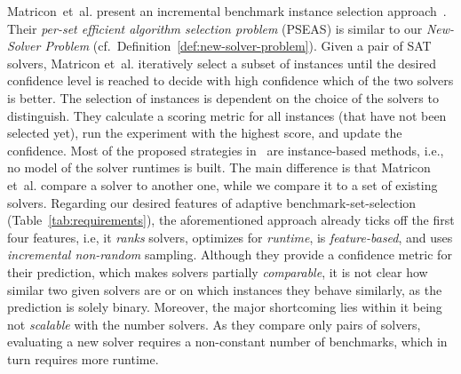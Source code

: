 \documentclass[runningheads]{llncs}
\begin{document}
Matricon~et~al. present an incremental benchmark instance selection approach~\cite{MatriconAFSH21}.
Their \emph{per-set efficient algorithm selection problem} (PSEAS) is similar to our \emph{New-Solver Problem} (cf.~Definition~\ref{def:new-solver-problem}).
Given a pair of SAT solvers, Matricon et~al. iteratively select a subset of instances until the desired confidence level is reached to decide with high confidence which of the two solvers is better.
The selection of instances is dependent on the choice of the solvers to distinguish.
They calculate a scoring metric for all instances (that have not been selected yet), run the experiment with the highest score, and update the confidence.
Most of the proposed strategies in~\cite{MatriconAFSH21} are instance-based methods, i.e., no model of the solver runtimes is built.
The main difference is that Matricon et~al. compare a solver to another one, while we compare it to a set of existing solvers.
Regarding our desired features of adaptive benchmark-set-selection (Table~\ref{tab:requirements}), the aforementioned approach already ticks off the first four features, i.e, it \emph{ranks} solvers, optimizes for \emph{runtime}, is \emph{feature-based}, and uses \emph{incremental non-random} sampling.
Although they provide a confidence metric for their prediction, which makes solvers partially \emph{comparable}, it is not clear how similar two given solvers are or on which instances they behave similarly, as the prediction is solely binary.
Moreover, the major shortcoming lies within it being not \emph{scalable} with the number solvers.
As they compare only pairs of solvers, evaluating a new solver requires a non-constant number of benchmarks, which in turn requires more runtime.


\end{document}
